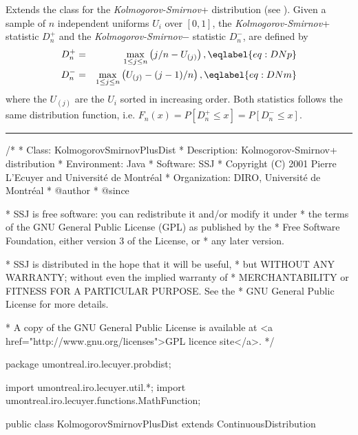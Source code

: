 
\newcommand{\ks}{{\em Kolmogorov-Smirnov\/}}

Extends the class  for the
\ks+{}  distribution (see \cite{tDAR60a,tDUR73a,tBRO07a}).
Given a sample of $n$ independent uniforms $U_i$ over $[0,1]$,
the \ks+{} statistic $D_n^+$ and the \ks$-${} statistic $D_n^-$,
 are defined by
\begin {eqnarray}
  D_n^+ &=& \max_{1\le j\le n} \left(j/n - U_{(j)}\right),
                                                    \eqlabel{eq:DNp} \\
  D_n^- &=& \max_{1\le j\le n} \left(U_{(j)} - (j-1)/n\right),
                                                    \eqlabel{eq:DNm}
\end {eqnarray}
where the $U_{(j)}$ are the $U_i$ sorted in increasing order. Both statistics
follows the same distribution function, i.e.
$F_n(x) = P[D_n^+ \le x] = P[D_n^- \le x]$.


\bigskip\hrule

\begin{code}
\begin{hide}
/*
 * Class:        KolmogorovSmirnovPlusDist
 * Description:  Kolmogorov-Smirnov+ distribution
 * Environment:  Java
 * Software:     SSJ 
 * Copyright (C) 2001  Pierre L'Ecuyer and Université de Montréal
 * Organization: DIRO, Université de Montréal
 * @author       
 * @since

 * SSJ is free software: you can redistribute it and/or modify it under
 * the terms of the GNU General Public License (GPL) as published by the
 * Free Software Foundation, either version 3 of the License, or
 * any later version.

 * SSJ is distributed in the hope that it will be useful,
 * but WITHOUT ANY WARRANTY; without even the implied warranty of
 * MERCHANTABILITY or FITNESS FOR A PARTICULAR PURPOSE.  See the
 * GNU General Public License for more details.

 * A copy of the GNU General Public License is available at
   <a href="http://www.gnu.org/licenses">GPL licence site</a>.
 */
\end{hide}
package umontreal.iro.lecuyer.probdist;
\begin{hide}
import umontreal.iro.lecuyer.util.*;
import umontreal.iro.lecuyer.functions.MathFunction;
\end{hide}

public class KolmogorovSmirnovPlusDist extends ContinuousDistribution\begin{hide} {
   protected int n;

   private static class Function implements MathFunction {
      protected int n;
      protected double u;

      public Function (int n, double u) {
         this.n = n;
         this.u = u;
      }

      public double evaluate (double x) {
         return u - cdf(n,x);
      }
   }
\end{hide}
\end{code}
